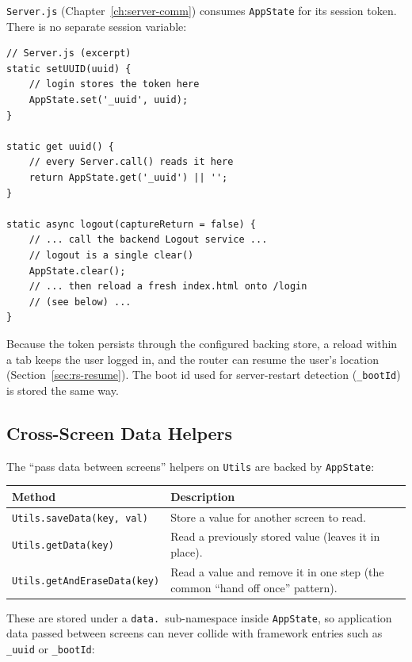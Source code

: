\texttt{Server.js} (Chapter~\ref{ch:server-comm}) consumes \texttt{AppState} for its session token.  There is no separate session variable:

\begin{lstlisting}[style=javascript]
// Server.js (excerpt)
static setUUID(uuid) {
    // login stores the token here
    AppState.set('_uuid', uuid);
}

static get uuid() {
    // every Server.call() reads it here
    return AppState.get('_uuid') || '';
}

static async logout(captureReturn = false) {
    // ... call the backend Logout service ...
    // logout is a single clear()
    AppState.clear();
    // ... then reload a fresh index.html onto /login
    // (see below) ...
}
\end{lstlisting}

\noindent
Because the token persists through the configured backing store, a reload within a tab keeps the user logged in, and the router can resume the user's location (Section~\ref{sec:rs-resume}).  The boot id used for server-restart detection (\texttt{\_bootId}) is stored the same way.

\subsection{Cross-Screen Data Helpers}
\label{sec:rs-appstate-data}

The ``pass data between screens'' helpers on \texttt{Utils} are backed by \texttt{AppState}:

\begin{longtable}{P{0.34\textwidth}P{0.58\textwidth}}
\toprule
\textbf{Method} & \textbf{Description} \\
\midrule
\endhead
\texttt{Utils.saveData(key, val)} & Store a value for another screen to read. \\
\texttt{Utils.getData(key)} & Read a previously stored value (leaves it in place). \\
\texttt{Utils.\allowbreak getAndEraseData(\allowbreak key)} & Read a value and remove it in one step (the common ``hand off once'' pattern). \\
\bottomrule
\end{longtable}

\noindent
These are stored under a \texttt{data.}\ sub-namespace inside \texttt{AppState}, so application data passed between screens can never collide with framework entries such as \texttt{\_uuid} or \texttt{\_bootId}:

